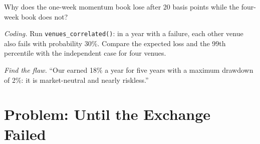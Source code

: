 \begin{exercise}[$\star\star$]\label{exo:s1:crypto-medium-frequency-strategies:6}
Why does the one-week momentum book lose after 20 basis points while the four-week book does not?
\end{exercise}

\begin{exercise}[$\star\star\star$]\label{exo:s1:crypto-medium-frequency-strategies:7}
\emph{Coding.} Run \texttt{venues\_correlated()}: in a year with a failure, each other venue also fails with probability 30\%. Compare the expected
loss and the 99th percentile with the independent case for four venues.
\end{exercise}

\begin{exercise}[$\star\star\star$]\label{exo:s1:crypto-medium-frequency-strategies:8}
\emph{Find the flaw.} ``Our  earned 18\% a year for five years with a maximum drawdown of 2\%: it is market-neutral and nearly riskless.''
\end{exercise}

\section{Problem: Until the Exchange Failed}

